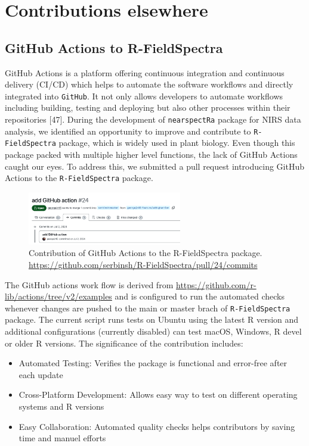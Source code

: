 \documentclass[12pt,a4paper]{report}
\begin{document}
\section{Contributions elsewhere}
\subsection{GitHub Actions to R-FieldSpectra}

GitHub Actions is a platform offering continuous integration and continuous delivery (CI/CD) which helps to automate the software workflows and directly integrated into \texttt{GitHub}. It not only allows developers to automate workflows including building, testing and deploying but also other processes within their repositories [47]. During the development of \texttt{nearspectRa} package for NIRS data analysis, we identified an opportunity to improve and contribute to \texttt{R-FieldSpectra} package, which is widely used in plant biology. Even though this package packed with multiple higher level functions, the lack of GitHub Actions caught our eyes. To address this, we submitted a pull request introducing GitHub Actions to the \texttt{R-FieldSpectra} package. \\

\begin{figure}[h]
    \centering
    \includegraphics[width=0.6\textwidth]{Figures/github_actions.png}
    \caption{Contribution of GitHub Actions to the R-FieldSpectra package. \\ \url{https://github.com/serbinsh/R-FieldSpectra/pull/24/commits}}
    \label{fig:github_actions}
\end{figure}

The GitHub actions work flow is derived from \url{https://github.com/r-lib/actions/tree/v2/examples} and is configured to run the automated checks whenever changes are pushed to the main or master brach of \texttt{R-FieldSpectra} package. The current script runs tests on Ubuntu using the latest R version and additional configurations (currently disabled) can test macOS, Windows, R devel or older R versions. The significance of the contribution includes:
\begin{itemize}
    \item Automated Testing: Verifies the package is functional and error-free after each update
    \item Cross-Platform Development: Allows easy way to test on different operating systems and R versions
    \item Easy Collaboration: Automated quality checks helps contributors  by saving time and manuel efforts
\end{itemize}
\end{document}
